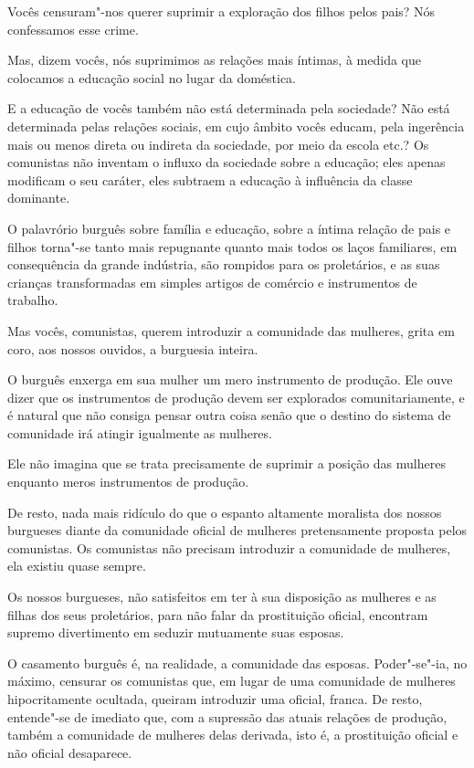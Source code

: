 Vocês censuram"-nos querer suprimir a exploração dos filhos pelos pais?
Nós confessamos esse crime.

Mas, dizem vocês, nós suprimimos as relações mais íntimas, à medida que
colocamos a educação social no lugar da doméstica.

E a educação de vocês também não está determinada pela sociedade? Não
está determinada pelas relações sociais, em cujo âmbito vocês educam,
pela ingerência mais ou menos direta ou indireta da sociedade, por meio
da escola etc.? Os comunistas não inventam o influxo da sociedade sobre
a educação; eles apenas modificam o seu caráter, eles subtraem a
educação à influência da classe dominante.

O palavrório burguês sobre família e educação, sobre a íntima relação de
pais e filhos torna"-se tanto mais repugnante quanto mais todos os
laços familiares, em consequência da grande indústria, são rompidos
para os proletários, e as suas crianças transformadas em simples
artigos de comércio e instrumentos de trabalho.

Mas vocês, comunistas, querem introduzir a comunidade das mulheres,
grita em coro, aos nossos ouvidos, a burguesia inteira.

O burguês enxerga em sua mulher um mero instrumento de produção. Ele
ouve dizer que os instrumentos de produção devem ser explorados
comunitariamente, e é natural que não consiga pensar outra coisa senão
que o destino do sistema de comunidade irá atingir igualmente as
mulheres.

Ele não imagina que se trata precisamente de suprimir a posição das
mulheres enquanto meros instrumentos de produção.

De resto, nada mais ridículo do que o espanto altamente moralista dos
nossos burgueses diante da comunidade oficial de mulheres pretensamente
proposta pelos comunistas. Os comunistas não precisam introduzir a
comunidade de mulheres, ela existiu quase sempre.

Os nossos burgueses, não satisfeitos em ter à sua disposição as mulheres
e as filhas dos seus proletários, para não falar da prostituição
oficial, encontram supremo divertimento em seduzir mutuamente suas
esposas.

O casamento burguês é, na realidade, a comunidade das esposas.
Poder"-se"-ia, no máximo, censurar os comunistas que, em lugar de
uma comunidade de mulheres hipocritamente ocultada, queiram
introduzir uma oficial, franca. De resto, entende"-se de imediato que,
com a supressão das atuais relações de produção, também a comunidade de
mulheres delas derivada, isto é, a prostituição oficial e não oficial
desaparece.

